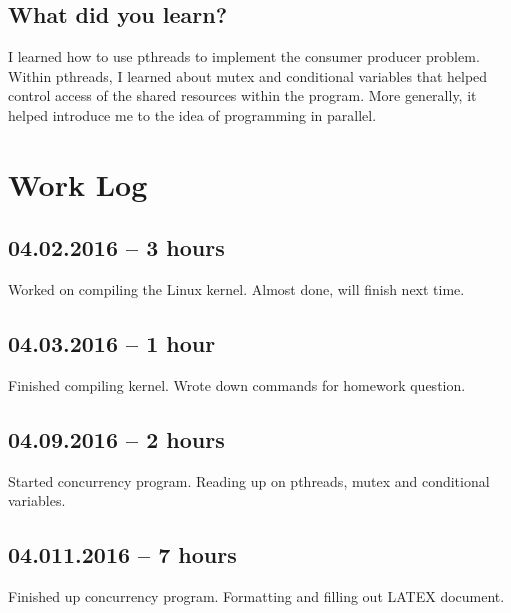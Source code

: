 \documentclass[letterpaper,
10pt, titlepage, draftclsnofoot, onecolumn]{IEEEtran}
\begin{document}
\subsection*{What did you learn?}

I learned how to use pthreads to implement the consumer producer problem. Within pthreads, I learned about mutex and conditional variables that helped control access of the shared resources within the program. More generally, it helped introduce me to the idea of programming in parallel.

\section*{Work Log}
\subsection*{04.02.2016 -- 3 hours}
Worked on compiling the Linux kernel. Almost done, will finish next time.
\subsection*{04.03.2016 -- 1 hour}
Finished compiling kernel. Wrote down commands for homework question.
\subsection*{04.09.2016 -- 2 hours}
Started concurrency program. Reading up on pthreads, mutex and conditional variables.
\subsection*{04.011.2016 -- 7 hours}
Finished up concurrency program. Formatting and filling out LATEX document.
\end{document}

